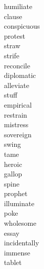 \documentclass[a4paper, 11pt]{ctexart}
\begin{document}
\begin{multicols*}{3}
\begin{description}
\item[humiliate]

\item[clause]

\item[conspicuous]

\item[protest]

\item[straw]

\item[strife]

\item[reconcile]

\item[diplomatic]

\item[alleviate]

\item[stuff]

\item[empirical]

\item[restrain]

\item[mistress]

\item[sovereign]

\item[swing]

\item[tame]

\item[heroic]

\item[gallop]

\item[spine]

\item[prophet]

\item[illuminate]

\item[poke]

\item[wholesome]

\item[essay]

\item[incidentally]

\item[immense]

\item[tablet]


\end{description}
\end{multicols*}
\end{document}
